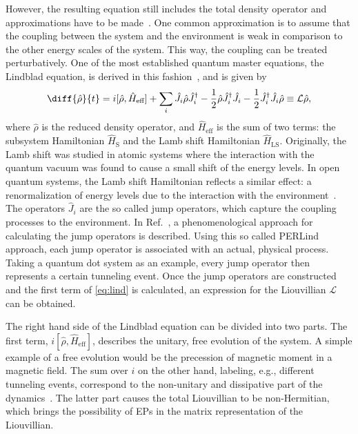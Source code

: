 \documentclass[../main.tex]{subfiles}
\begin{document}
However, the resulting equation still includes the total density operator and approximations have to be made~\cite{lindblad}. One common approximation is to assume that the coupling between the system and the environment is weak in comparison to the other energy scales of the system. This way, the coupling can be treated perturbatively. One of the most established quantum master equations, the Lindblad equation, is derived in this fashion~\cite{lindorigin}, and is given by
\begin{equation}\label{eq:lind}
    \diff{\hat\rho}{t} = i[\hat\rho, \hat H_\text{eff}] + \sum_i \hat J_i\hat\rho\hat J_i^\dag - \frac{1}{2}\hat\rho\hat J_i^\dag\hat J_i - \frac{1}{2}\hat J_i^\dag\hat J_i \hat\rho \equiv \mathcal{L}\hat\rho,
\end{equation}
where $\hat \rho$ is the reduced density operator, and $\hat H_\text{eff}$ is the sum of two terms: the subsystem Hamiltonian $\hat H_\text{S}$ and the Lamb shift Hamiltonian $\hat H_\text{LS}$. Originally, the Lamb shift was studied in atomic systems where the interaction with the quantum vacuum was found to cause a small shift of the energy levels. In open quantum systems, the Lamb shift Hamiltonian reflects a similar effect: a renormalization of energy levels due to the interaction with the environment~\cite{lindblad}. The operators $\hat J_i$ are the so called jump operators, which capture the coupling processes to the environment. In Ref.~\cite{perlind}, a phenomenological approach for calculating the jump operators is described. Using this so called PERLind approach, each jump operator is associated with an actual, physical process. Taking a quantum dot system as an example, every jump operator then represents a certain tunneling event. Once the jump operators are constructed and the first term of \cref{eq:lind} is calculated, an expression for the Liouvillian $\mathcal{L}$ can be obtained. 

The right hand side of the Lindblad equation can be divided into two parts. The first term, $i[\hat\rho, \hat H_\text{eff}]$, describes the unitary, free evolution of the system. A simple example of a free evolution would be the precession of magnetic moment in a magnetic field. The sum over $i$ on the other hand, labeling, e.g., different tunneling events, correspond to the non-unitary and dissipative part of the dynamics~\cite{bookopen}. The latter part causes the total Liouvillian to be non-Hermitian, which brings the possibility of EPs in the matrix representation of the Liouvillian.
\end{document}
